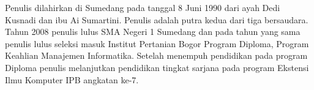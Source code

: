 Penulis dilahirkan di Sumedang pada tanggal 8 Juni 1990 dari ayah Dedi Kusnadi dan ibu Ai Sumartini. Penulis adalah putra kedua dari tiga bersaudara. Tahun 2008 penulis lulus SMA Negeri 1 Sumedang dan pada tahun yang sama penulis lulus seleksi masuk Institut Pertanian Bogor Program Diploma, Program Keahlian Manajemen Informatika. Setelah menempuh pendidikan pada program Diploma penulis melanjutkan pendidikan tingkat sarjana pada program Ekstensi Ilmu Komputer IPB angkatan ke-7.
